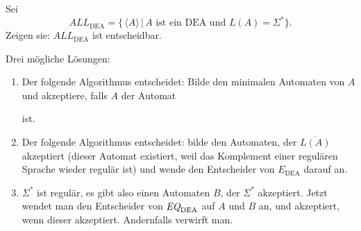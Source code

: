 Sei
\[
{ALL}_{\text{DEA}}=\{\, \langle A\rangle\, |\, \text{$A$ ist ein DEA und $L(A)=\Sigma^*$}\}.
\]
Zeigen sie:
$ALL_{\text{DEA}}$ ist entscheidbar.


\begin{loesung}
Drei mögliche Lösungen:
\begin{enumerate}
\item
Der folgende Algorithmus entscheidet: Bilde den minimalen Automaten von
$A$ und akzeptiere, falls $A$ der Automat
\begin{center}
\end{center}
ist.
\item
Der folgende Algorithmus entscheidet: bilde den Automaten, der
$\overline{L(A)}$ akzeptiert (dieser Automat existiert, weil
das Komplement einer regulären Sprache wieder regulär ist)
und wende den Entscheider von $E_\text{DEA}$ darauf an.
\item
$\Sigma^*$ ist regulär, es gibt also einen Automaten $B$, der
$\Sigma^*$ akzeptiert. Jetzt wendet man den Entscheider von
$\text{\it EQ}_{\text{DEA}}$ auf $A$ und $B$ an, und akzeptiert,
wenn dieser akzeptiert. Andernfalls verwirft man.
\qedhere
\end{enumerate}
\end{loesung}
